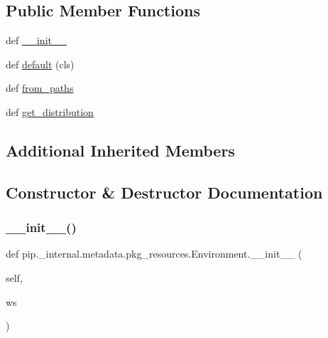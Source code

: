 \subsection*{Public Member Functions}
\begin{DoxyCompactItemize}
\item 
def \hyperlink{classpip_1_1__internal_1_1metadata_1_1pkg__resources_1_1Environment_a93391ed89505319e9f80c22f0a8b7978}{\+\_\+\+\_\+init\+\_\+\+\_\+}
\item 
def \hyperlink{classpip_1_1__internal_1_1metadata_1_1pkg__resources_1_1Environment_a32612efdcd1c8640f22348db5fb628b1}{default} (cls)
\item 
def \hyperlink{classpip_1_1__internal_1_1metadata_1_1pkg__resources_1_1Environment_af3bba9399312883824757bd09395a3cf}{from\+\_\+paths}
\item 
def \hyperlink{classpip_1_1__internal_1_1metadata_1_1pkg__resources_1_1Environment_afdb2c49973452ed0a746c92133e5ae3f}{get\+\_\+distribution}
\end{DoxyCompactItemize}
\subsection*{Additional Inherited Members}


\subsection{Constructor \& Destructor Documentation}
\mbox{\label{classpip_1_1__internal_1_1metadata_1_1pkg__resources_1_1Environment_a93391ed89505319e9f80c22f0a8b7978}} 
\subsubsection{\texorpdfstring{\+\_\+\+\_\+init\+\_\+\+\_\+()}{\_\_init\_\_()}}
{\footnotesize\ttfamily def pip.\+\_\+internal.\+metadata.\+pkg\+\_\+resources.\+Environment.\+\_\+\+\_\+init\+\_\+\+\_\+ (\begin{DoxyParamCaption}\item[{}]{self,  }\item[{}]{ws }\end{DoxyParamCaption})}




